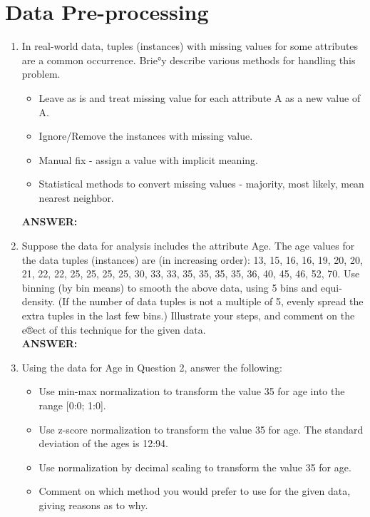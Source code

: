 \documentclass{article}
\begin{document}
\section{Data Pre-processing}
\begin{enumerate}
\item In real-world data, tuples (instances) with missing values for
  some attributes are a common occurrence. Brie°y describe various
  methods for handling this problem. 
\begin{itemize}
\item Leave as is and treat missing value for each attribute A as a new
  value of A. 
\item Ignore/Remove the instances with missing value. 
\item Manual fix - assign a value with implicit meaning. 
\item Statistical methods to convert missing values - majority, most
  likely, mean nearest neighbor.
\end{itemize}

\textbf{ANSWER:} 

\item Suppose the data for analysis includes the attribute Age. The age
values for the data tuples (instances) are (in increasing order): 13,
15, 16, 16, 19, 20, 20, 21, 22, 22, 25, 25, 25, 25, 30, 33, 33, 35, 35,
35, 35, 36, 40, 45, 46, 52, 70. Use binning (by bin means) to smooth the
above data, using 5 bins and equi-density. (If the number of data tuples
is not a multiple of 5, evenly spread the extra tuples in the last few
bins.) Illustrate your steps, and comment on the e®ect of this technique
for the given data. \\
\textbf{ANSWER:} 

\item Using the data for Age in Question 2, answer the following:  \\
\begin{itemize}
\item Use min-max normalization to transform the value 35 for age into the
  range [0:0; 1:0].  
\item Use z-score normalization to transform the value
  35 for age. The standard deviation of the ages is 12:94.  
\item Use normalization by decimal scaling to transform the value 35 for
  age.  
\item Comment on which method you would prefer to use for the given data,
giving reasons as to why.
\end{itemize}


\end{enumerate}
\end{document}

